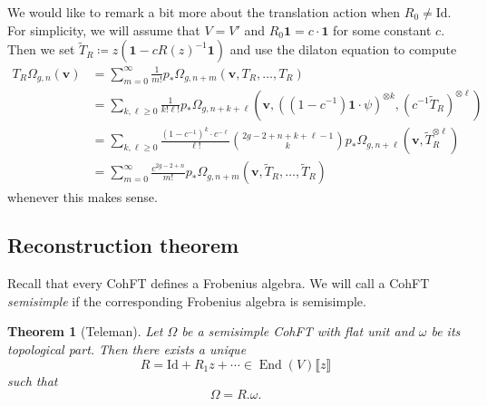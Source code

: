 \documentclass{amsart}
\newtheorem{thm}{Theorem}[section]
\theoremstyle{definition}
\theoremstyle{remark}
\theoremstyle{plain}
\theoremstyle{definition}
\theoremstyle{remark}
\newcommand{\mbf}[1]{\mathbf{#1}}
\newcommand{\bv}{\mbf{v}}
\newcommand{\mr}[1]{\mathrm{#1}}
\newcommand{\1}{\mathbf{1}}
\newcommand{\2}{\mathbf{2}}
\newcommand{\3}{\mathbf{3}}
\newcommand{\ps}[1]{\llbracket #1 \rrbracket}
\DeclareMathOperator{\End}{End}
\begin{document}
We would like to remark a bit more about the translation action when $R_0 \neq \mr{Id}$. For simplicity, we will assume that $V = V'$ and $R_0 \1 = c \cdot \1$ for some constant $c$. Then we set $\tilde{T}_R \coloneqq z( \1 - c R(z)^{-1} \1)$ and use the dilaton equation to compute
\begin{align*}
    T_R \Omega_{g,n}(\bv) &= \sum_{m=0}^{\infty} \frac{1}{m!} p_*\Omega_{g,n+m}(\bv, T_R, \ldots, T_R) \\
    &= \sum_{k,\ell \geq 0} \frac{1}{k!\ell!} p_* \Omega_{g,n+k+\ell}(\bv, ( (1-c^{-1})\1 \cdot \psi )^{\otimes k}, ( c^{-1} \tilde{T}_R )^{\otimes \ell}) \\
    &= \sum_{k,\ell \geq 0} \frac{(1-c^{-1})^k \cdot c^{-\ell}}{\ell!} \binom{2g-2+n+k+\ell-1}{k} p_* \Omega_{g,n+\ell}(\bv, \tilde{T}_R^{\otimes \ell}) \\
    &= \sum_{m=0}^{\infty} \frac{c^{2g-2+n}}{m!} p_* \Omega_{g,n+m}(\bv, \tilde{T}_R, \ldots, \tilde{T}_R)
\end{align*}
whenever this makes sense.


\subsection{Reconstruction theorem}%
\label{sub:Reconstruction theorem}

Recall that every CohFT defines a Frobenius algebra. We will call a CohFT \textit{semisimple} if the corresponding Frobenius algebra is semisimple.

\begin{thm}[Teleman]%
\label{thm:teleman}
    Let $\Omega$ be a semisimple CohFT with flat unit and $\omega$ be its topological part. Then there exists a unique 
    \[ R = \mr{Id} + R_1 z + \cdots \in \End(V)\ps{z} \]
    such that
    \[ \Omega = R.\omega. \]
\end{thm}
\end{document}
